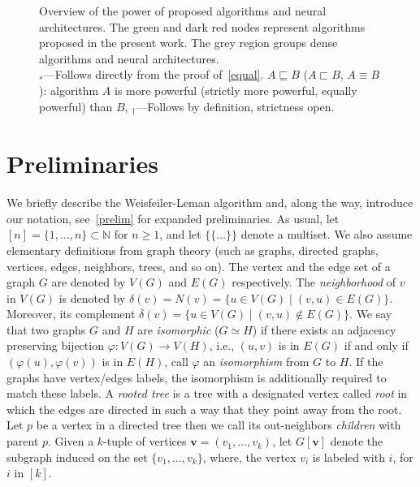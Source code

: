 \documentclass{article}
\theoremstyle{definition}
\newcommand{\new}[1]{\emph{#1}}
\newcommand{\NN}{\mathbb{N}}
\newcommand{\ndelta}{\ensuremath{\overline{\delta}}}
\renewcommand{\vec}[1]{\mathbf{#1}}
\begin{document}
\begin{figure}[t]
\begin{center}
{}
	\end{center}
	\caption{Overview of the power of proposed algorithms and neural architectures. The green and dark red nodes represent algorithms proposed in the present work. The grey region groups dense algorithms and neural architectures. \\
		$_*$---Follows directly from the proof of~\cref{equal}. $A \sqsubseteq B$ ($A \sqsubset B$, $A \equiv B$): algorithm $A$ is  more powerful (strictly more powerful, equally powerful) than $B$, 	$_{\dagger}$---Follows by definition, strictness open.}\label{overview}
\end{figure}

\section{Preliminaries}

We briefly describe the Weisfeiler-Leman algorithm and, along the way, introduce our notation, see~\cref{prelim} for expanded preliminaries. As usual, let $[n] = \{ 1, \dotsc, n \} \subset \NN$ for $n \geq 1$, and let $\{\!\!\{ \dots\}\!\!\}$ denote a multiset. We also assume elementary definitions from graph theory (such as graphs, directed graphs, vertices, edges, neighbors,
trees, and so on). The vertex and the edge set of a graph $G$ are denoted by $V(G)$ and $E(G)$ respectively. The \new{neighborhood} of $v$ in $V(G)$ is denoted by $\delta(v) = N(v) = \{ u \in V(G) \mid (v, u) \in E(G) \}$. Moreover, its complement $\ndelta(v) = \{ u \in V(G) \mid (v, u) \notin E(G) \}$. We say that two graphs $G$ and $H$ are \new{isomorphic} ($G \simeq H$) if there exists an adjacency preserving bijection $\varphi \colon V(G) \to V(H)$, i.e., $(u,v)$ is in $E(G)$ if and only if 
$(\varphi(u),\varphi(v))$ is in $E(H)$, call $\varphi$ an \emph{isomorphism} from $G$ to $H$. If the graphs have vertex/edges labels, the isomorphism is additionally required to match these labels. A \new{rooted tree} is a tree with a designated vertex called \new{root} in which the edges are directed in such a way that they point away from the root. Let $p$ be a vertex in a directed tree then we call its out-neighbors \new{children} with parent $p$. Given a $k$-tuple of vertices $\vec{v} = (v_1,\dots,v_k)$, let $G[\vec{v}]$ denote the subgraph induced on the set $\{v_1,\dots,v_k\}$, where, the vertex $v_i$ is labeled with $i$, for $i$ in $[k]$. 
\end{document}
